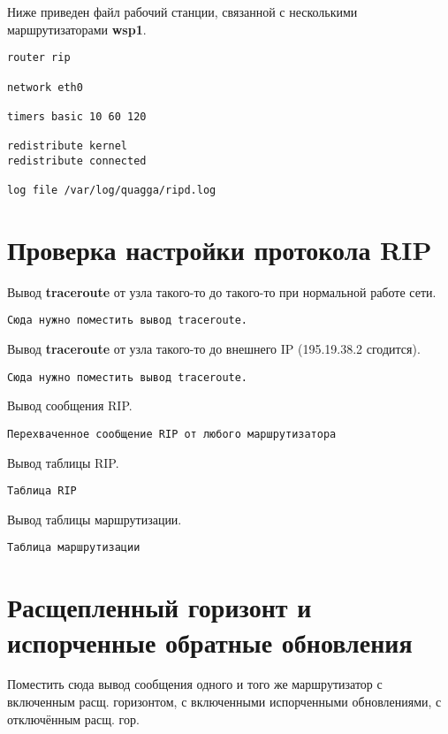 \documentclass[a4paper,12pt]{article}
\begin{document}
Ниже приведен файл  рабочий станции, связанной с несколькими маршрутизаторами \textbf{wsp1}.

\begin{Verbatim}
router rip

network eth0

timers basic 10 60 120

redistribute kernel
redistribute connected

log file /var/log/quagga/ripd.log
\end{Verbatim}


\section{Проверка настройки протокола RIP}

Вывод \textbf{traceroute} от узла такого-то до такого-то при нормальной работе сети.

\begin{Verbatim}
Сюда нужно поместить вывод traceroute.
\end{Verbatim}

Вывод \textbf{traceroute} от узла такого-то до внешнего IP (195.19.38.2 сгодится).

\begin{Verbatim}
Сюда нужно поместить вывод traceroute.
\end{Verbatim}

Вывод сообщения RIP.

\begin{Verbatim}
Перехваченное сообщение RIP от любого маршрутизатора
\end{Verbatim}

Вывод таблицы RIP.

\begin{Verbatim}
Таблица RIP
\end{Verbatim}

Вывод таблицы маршрутизации.

\begin{Verbatim}
Таблица маршрутизации
\end{Verbatim}

\section{Расщепленный горизонт и испорченные обратные обновления}

Поместить сюда вывод сообщения одного и того же маршрутизатор с включенным расщ. горизонтом, с включенными испорченными обновлениями, с отключённым расщ. гор.
\end{document}
